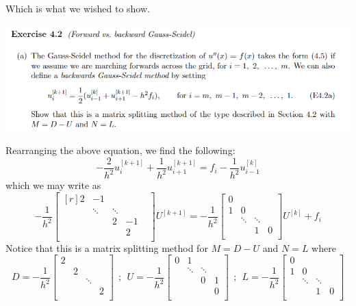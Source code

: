 \documentclass{article}
\begin{document}
Which is what we wished to show.
\newline\newline

\includegraphics[scale = 0.8]{ex4.2a.PNG}
\newline

Rearranging the above equation, we find the following:
\[-\frac{2}{h^2}u_i^{[k+1]} + \frac{1}{h^2}u_{i+1}^{[k+1]} = f_i - \frac{1}{h^2}u_{i-1}^{[k]}\]
which we may write as
\[-\frac{1}{h^2}\begin{bmatrix*}[r]
    2 & -1 & & & \\
    & \ddots & \ddots & \\
    & & 2 & -1\\
    & & & 2 \\
\end{bmatrix*}U^{[k+1]} = -\frac{1}{h^2}\begin{bmatrix}
    0 & & & \\
    1 & 0 & &\\
    & \ddots & \ddots & \\
    & & 1 & 0\\
\end{bmatrix}U^{[k]} + f_i\]
Notice that this is a matrix splitting method for $M = D - U$ and $N = L$ where
\[D = -\frac{1}{h^2}\begin{bmatrix}
    2 & & & \\
    & 2 & & \\
    & & \ddots & \\
    & & & 2 \\
\end{bmatrix} \:\: ; \:\: U = -\frac{1}{h^2}\begin{bmatrix}
    0 & 1 & & \\
    & \ddots & \ddots & \\
    & & 0 & 1 \\
    & & & 0 \\
\end{bmatrix} \:\: ; \:\: L = -\frac{1}{h^2} \begin{bmatrix}
    0 & & & \\
    1 & 0 & & \\
     & \ddots & \ddots & \\
     & & 1 & 0 \\
\end{bmatrix}\]
\end{document}
